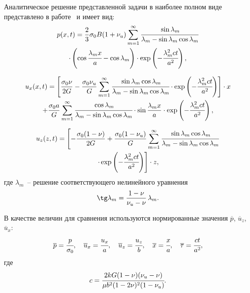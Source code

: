 Аналитическое решение представленной задачи в наиболее полном виде представлено в работе~\cite{cheng_1988}
и имеет вид:
\begin{multline}
\label{eq:PMan}
%
p(x,t) = \frac23 \sigma_0 B (1+\nu_u) \sum \limits_{m=1}^{\infty} \cfrac{\sin \lambda_m}{\lambda_m - \sin\lambda_m \cos\lambda_m} \\
%
\cdot \left( \cos\cfrac{\lambda_m x}{a} -\cos \lambda_m \right)
\cdot \exp \left( -\cfrac{\lambda_m^2 ct}{a^2} \right),
%
\end{multline}

\begin{multline}
\label{eq:UrMan}
%
u_x(x,t) = 
\left[
\frac{\sigma_0 \nu}{2G} - \frac{\sigma_0 \nu_u}{G} \sum \limits_{m=1}^{\infty}
\cfrac{\sin \lambda_m \cos \lambda_m}{\lambda_m - \sin\lambda_m \cos\lambda_m}
\cdot \exp \left( -\cfrac{\lambda_m^2 ct}{a^2} \right) 
\right]\cdot x \\
%
+ \frac{\sigma_0 a}{G} 
\sum \limits_{m=1}^{\infty} \cfrac{\cos \lambda_m}{\lambda_m - \sin\lambda_m \cos\lambda_m}
\cdot \sin \frac{\lambda_m x}{a} \cdot \exp \left( -\cfrac{\lambda_m^2 ct}{a^2} \right),
%
\end{multline}

\begin{multline}
\label{eq:UzMan}
%
u_z(z,t) = 
\left[
- \frac{ \sigma_0 (1-\nu)}{2G} + \frac{\sigma_0 (1-\nu_u)}{G} \sum \limits_{m=1}^{\infty}
\cfrac{\sin \lambda_m \cos \lambda_m}{\lambda_m - \sin\lambda_m \cos\lambda_m} \right. \\
\left.
\cdot \exp \left( -\cfrac{\lambda_m^2 ct}{a^2} \right) 
\right]\cdot z,
%
\end{multline}
где $\lambda_m$~-- решение соответствующего нелинейного уравнения
\begin{equation}
\label{eq:ManNonLin}
%
\tg \lambda_m = \frac{1-\nu}{\nu_u - \nu} \,\lambda_m.
%
\end{equation}

В качестве величин для сравнения используются 
нормированные значения $\overline{p}$, $\overline{u}_z$, $\overline{u}_x$:
%
\begin{equation*}
%
\overline{p} = \cfrac{p}{\sigma_0}, \quad \overline{u}_x = \cfrac{u_x}{a}, \quad \overline{u}_z = \cfrac{u_z}{b}, \quad
\overline{x} = \cfrac{x}{a}, \quad \overline{\tau} = \cfrac{ct}{a^2},
%
\end{equation*}
%
где 
$$
c = \cfrac{2kG(1-\nu)(\nu_u-\nu)}{\mu b^2 (1-2\nu)^2(1-\nu_u)}.
$$

